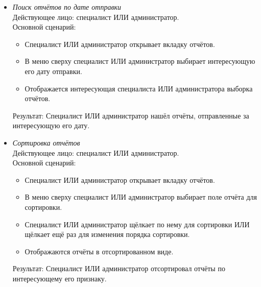 \begin{itemize}[topsep=0pt, parsep=0pt, itemsep=0pt, leftmargin=*, labelindent=0.5cm]
	\item \textit{Поиск отчётов по дате отправки} \\
	Действующее лицо: специалист ИЛИ администратор. \\
	Основной сценарий:
	\begin{itemize}[topsep=0pt, parsep=0pt, itemsep=0pt, leftmargin=*, labelindent=0.5cm]
		\item Специалист ИЛИ администратор открывает вкладку отчётов.
		\item В меню сверху специалист ИЛИ администратор выбирает интересующую его дату отправки.
		\item Отображается интересующая специалиста ИЛИ администратора выборка отчётов.
	\end{itemize}
	Результат: Специалист ИЛИ администратор нашёл отчёты, отправленные за интересующую его дату.
\end{itemize}

\begin{itemize}[topsep=0pt, parsep=0pt, itemsep=0pt, leftmargin=*, labelindent=0.5cm]
	\item \textit{Сортировка отчётов} \\
	Действующее лицо: специалист ИЛИ администратор. \\
	Основной сценарий:
	\begin{itemize}[topsep=0pt, parsep=0pt, itemsep=0pt, leftmargin=*, labelindent=0.5cm]
		\item Специалист ИЛИ администратор открывает вкладку отчётов.
		\item В меню сверху специалист ИЛИ администратор выбирает поле отчёта для сортировки.
		\item Специалист ИЛИ администратор щёлкает по нему для сортировки ИЛИ щёлкает ещё раз для изменения порядка сортировки.
		\item Отображаются отчёты в отсортированном виде.
	\end{itemize}
	Результат: Специалист ИЛИ администратор отсортировал отчёты по интересующему его признаку.
\end{itemize}


